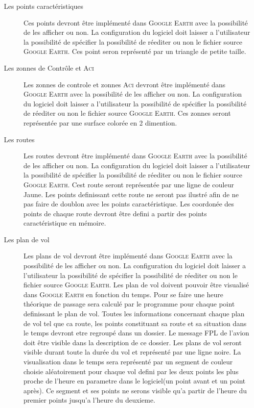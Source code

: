 \begin{description}
    \item[Les points caractéristiques] Ces points devront être implémenté dans \textsc{Google Earth} avec la possibilité de les afficher ou non. La configuration du logiciel doit laisser a l'utilisateur la possibilité de spécifier la possibilité de réediter ou non le fichier source \textsc{Google Earth}. Ces point seron représenté par un triangle de petite taille.
    \item[Les zonnes de Contrôle et \textsc{Aci}] Les zonnes de controle et zonnes \textsc{Aci} devront être implémenté dans \textsc{Google Earth} avec la possibilité de les afficher ou non. La configuration du logiciel doit laisser a l'utilisateur la possibilité de spécifier la possibilité de réediter ou non le fichier source \textsc{Google Earth}. Ces zonnes seront représentée par une surface colorée en 2 dimention.
    \item[Les routes] Les routes devront être implémenté dans \textsc{Google Earth} avec la possibilité de les afficher ou non. La configuration du logiciel doit laisser a l'utilisateur la possibilité de spécifier la possibilité de réediter ou non le fichier source \textsc{Google Earth}. Cest route seront représentée par une ligne de couleur Jaune. Les points definissant cette route ne seront pas ilustré afin de ne pas faire de doublon avec les points caractéristique. Les coordonée des points de chaque route devront être defini a partir des points caractéristique en mémoire.
    \item[Les plan de vol] Les plans de vol devront être implémenté dans \textsc{Google Earth} avec la possibilité de les afficher ou non. La configuration du logiciel doit laisser a l'utilisateur la possibilité de spécifier la possibilité de réediter ou non le fichier source \textsc{Google Earth}. Les plan de vol doivent pouvoir être visualisé dans \textsc{Google Earth} en fonction du temps. Pour se faire une heure théorique de passage sera calculé par le programme pour chaque point definissant le plan de vol. Toutes les informations concernant chaque plan de vol tel que ca route, les points constituant sa route et sa situation dans le temps devront etre regroupé dans un dossier. Le message FPL de l'avion doit être visible dans la description de ce dossier. Les plans de vol seront visible durant toute la durée du vol et représenté par une ligne noire. La visualisation dans le temps sera représenté par un segment de couleur choisie aléatoirement pour chaque vol defini par les deux points les plus proche de l'heure en parametre dans le logiciel(un point avant et un point après). Ce segment et ses points ne serons visible qu'a partir de l'heure du premier points jusqu'a l'heure du deuxieme. 

\end{description}
